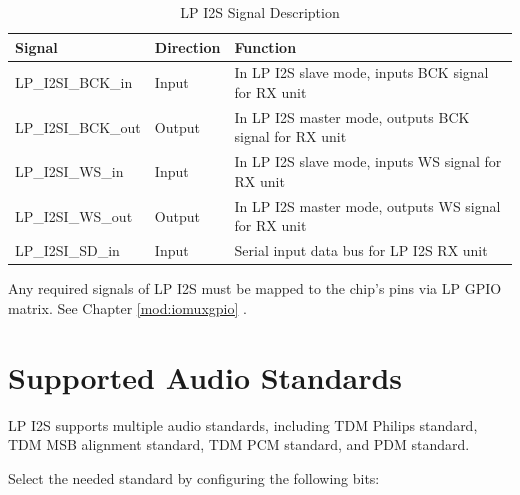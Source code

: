 \documentclass[main\_\_EN.tex]{subfiles}
\begin{document}
\begin{table}[H]
    \centering
    \caption{LP I2S Signal Description}
    \label{tab:lpi2s-signal-descr}
    \begin{threeparttable}
    \begin{tabular}{|p{2.8cm}|p{1.8cm}|p{10.2cm}| }
    \hline
    \rowcolor{lightgray}
    \textbf{Signal \tnote{*}} & \textbf{Direction} & \textbf{Function} \\
    \hline
    LP\_I2SI\_BCK\_in  & Input & In LP I2S slave mode, inputs BCK signal for RX unit \\
    \hline
    LP\_I2SI\_BCK\_out& Output & In LP I2S master mode, outputs BCK signal for RX unit \\
    \hline
    LP\_I2SI\_WS\_in & Input & In LP I2S slave mode, inputs WS signal for RX unit \\
    \hline
    LP\_I2SI\_WS\_out& Output & In LP I2S master mode, outputs WS signal for RX unit \\\hline
    LP\_I2SI\_SD\_in& Input & Serial input data bus for LP I2S RX unit\\\hline
    \end{tabular}
    \begin{tablenotes}
        \item[*] Any required signals of LP I2S must be mapped to the chip's pins via LP GPIO matrix. See Chapter \ref{mod:iomuxgpio} \textit{}.
    \end{tablenotes}
    \end{threeparttable}
\end{table}

\section{Supported Audio Standards} \label{sec:lpi2s-supported-audio-standards}

\chipname{} LP I2S supports multiple audio standards, including TDM Philips standard, TDM MSB alignment standard, TDM PCM standard, and PDM standard.

Select the needed standard by configuring the following bits:
\end{document}

